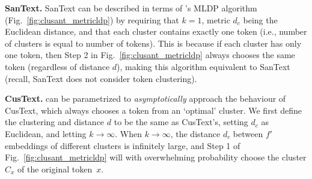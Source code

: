\vspace{0.5em}

\noindent
\textbf{SanText.} SanText can be described in terms of \clusant's MLDP algorithm (Fig.~\ref{fig:clusant_metricldp}) by requiring that $k = 1$, metric $d_c$ being the Euclidean distance, and that each cluster contains exactly one token (i.e., number of clusters is equal to number of tokens). This is because if each cluster has only one token, then Step 2 in Fig.~\ref{fig:clusant_metricldp} always chooses the same token (regardless of distance $d$), making this algorithm equivalent to SanText (recall, SanText does not consider token clustering).

\vspace{0.5em}

\noindent
\textbf{CusText.} \clusant can be parametrized to {\em asymptotically} approach the behaviour of CusText, which always chooses a token from an `optimal' cluster. We first define the clustering and distance $d$ to be the same as CusText's, setting $d_c$ as Euclidean, and letting $k \rightarrow \infty$. 
When $k \rightarrow \infty$, the distance $d_c$ between $f'$ embeddings of different clusters is infinitely large, and Step 1 of Fig.~\ref{fig:clusant_metricldp} will with overwhelming probability choose the cluster $C_x$ of the original token~$x$.